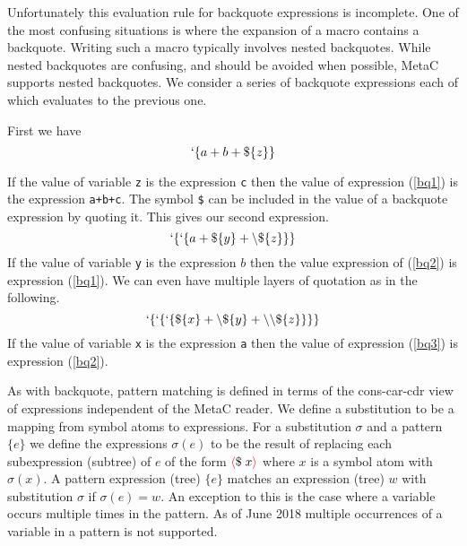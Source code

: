 \documentclass{article}
\newcommand{\fopen}{{\color{red} \langle}}
\newcommand{\fclose}{{\color{red} \rangle}}
\begin{document}
Unfortunately this evaluation rule for backquote expressions is incomplete.  One of the most
confusing situations is where the expansion of a macro contains a backquote.  Writing such a macro typically involves nested backquotes.  While nested backquotes
are confusing, and should be avoided when possible, MetaC supports nested backquotes.  We consider a series of backquote expressions each of which evaluates to the previous one.

First we have
\begin{equation}
\label{bq1}
`\{a+b+\$\{z\}\}
\end{equation}

If the value of variable {\tt z} is the expression {\tt c} then the value of expression (\ref{bq1}) is the expression {\tt a+b+c}.
The symbol {\tt \$} can be included in the value of a backquote expression by quoting it.  This gives our second expression.
\begin{equation}
\label{bq2}
`\{`\{a + \$\{y\} + \backslash\$\{z\}\}\}
\end{equation}
If the value of variable {\tt y} is the expression $b$ then the value expression of (\ref{bq2}) is expression (\ref{bq1}).
We can even have multiple layers of quotation as in the following.
\begin{equation}
\label{bq3}
`\{`\{`\{\$\{x\} + \backslash\$\{y\} + \backslash\backslash\$\{z\}\}\}\}
\end{equation}
If the value of variable {\tt x} is the expression {\tt a} then the value of expression (\ref{bq3}) is expression (\ref{bq2}).

As with backquote, pattern matching is defined in terms of the cons-car-cdr view of expressions independent of the MetaC reader.  We define a substitution to be a mapping from
symbol atoms to expressions. For a substitution $\sigma$ and a pattern $\{e\}$ we define the expressions $\sigma(e)$
to be the result of replacing each subexpression (subtree) of $e$ of the form $\fopen \$\;x \fclose$ where $x$ is a symbol atom with $\sigma(x)$.  A pattern expression (tree) $\{e\}$ matches an expression (tree) $w$ with substitution $\sigma$
if $\sigma(e) = w$. An exception to this is the case where a variable occurs multiple times in the pattern.  As of June 2018 multiple occurrences of a variable in a pattern is not supported.
\end{document}
